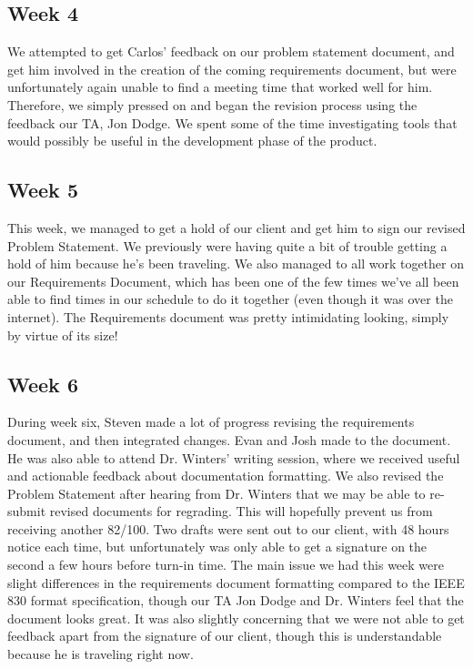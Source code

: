\documentclass[onecolumn, draftclsnofoot,10pt, compsoc]{IEEEtran}
\begin{document}
\subsection{Week 4}
We attempted to get Carlos' feedback on our problem statement document,
and get him involved in the creation of the coming requirements document,
but were unfortunately again unable to find a meeting time that worked
well for him. Therefore, we simply pressed on and began the revision process
using the feedback our TA, Jon Dodge. We spent some of the time investigating
tools that would possibly be useful in the development phase of the product.

\subsection{Week 5}
This week, we managed to get a hold of our client and get him to sign our
revised Problem Statement. We previously were having quite a bit of trouble
getting a hold of him because he's been traveling. We also managed to all
work together on our Requirements Document, which has been one of the few
times we've all been able to find times in our schedule to do it together
(even though it was over the internet). The Requirements document was
pretty intimidating looking, simply by virtue of its size!

\subsection{Week 6}
During week six, Steven made a lot of progress revising the requirements document,
and then integrated changes. Evan and Josh made to the document. He was also able
to attend Dr. Winters' writing session, where we received useful and actionable
feedback about documentation formatting. We also revised the Problem Statement
after hearing from Dr. Winters that we may be able to re-submit revised documents
for regrading. This will hopefully prevent us from receiving another 82/100.
Two drafts were sent out to our client, with 48 hours notice each time, but
unfortunately was only able to get a signature on the second a few hours before
turn-in time. The main issue we had this week were slight differences in the
requirements document formatting compared to the IEEE 830 format specification,
though our TA Jon Dodge and Dr. Winters feel that the document looks great.
It was also slightly concerning that we were not able to get feedback apart
from the signature of our client, though this is understandable because he is
traveling right now.
\end{document}

